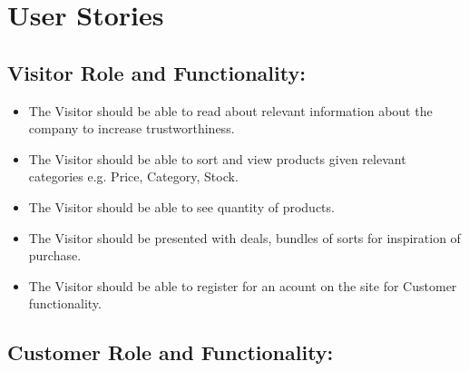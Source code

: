 \newpage

\section{User Stories}\label{app:user_stories}

\subsection{Visitor Role and Functionality:}

\begin{itemize}
    \item The Visitor should be able to read about relevant information
    about the company to increase trustworthiness.
    \item The Visitor should be able to sort and view  products given
    relevant categories e.g. Price, Category, Stock.
    \item The Visitor should be able to see quantity of products. 
    \item The Visitor should be presented with deals, bundles of sorts for
    inspiration of purchase.
    \item The Visitor should be able to register for an acount on the site for Customer functionality.
\end{itemize}


\subsection{Customer Role and Functionality:}

